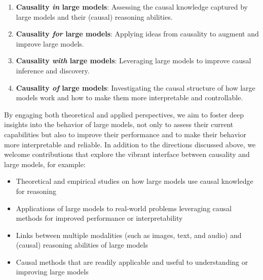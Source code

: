 \documentclass{article}
\begin{document}
\begin{enumerate}[nolistsep]
    \item \textbf{Causality \textit{in} large models}: Assessing the causal knowledge captured by large models and their (causal) reasoning abilities.
    \item \textbf{Causality \textit{for} large models}: Applying ideas from causality to augment and improve large models.
    \item \textbf{Causality \textit{with} large models}: Leveraging large models to improve causal inference and discovery.
    \item \textbf{Causality \textit{of} large models}: Investigating the causal structure of how large models work and how to make them more interpretable and controllable. 
\end{enumerate}

By engaging both theoretical and applied perspectives, we aim to foster deep insights into the behavior of large models, not only to assess their current capabilities but also to improve their performance and to make their behavior more interpretable and reliable. In addition to the directions discussed above, we welcome contributions that explore the vibrant interface between causality and large models, for example:

\begin{itemize}[nolistsep]
    \item Theoretical and empirical studies on how large models use causal knowledge for reasoning
    \item Applications of large models to real-world problems leveraging causal methods for improved performance or interpretability 
    \item Links between multiple modalities (such as images, text, and audio) and (causal) reasoning abilities of large models
    \item Causal methods that are readily applicable and useful to understanding or improving large models
\end{itemize}
\end{document}
